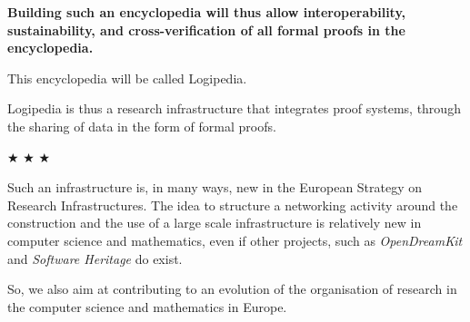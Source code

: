 {\bf Building such an encyclopedia will thus allow interoperability,
  sustainability, and cross-verification of all formal proofs in the
  encyclopedia.}

This encyclopedia will be called Logipedia.

Logipedia is thus a research infrastructure that integrates proof
systems, through the sharing of data in the form of formal proofs.




\begin{center}
$\bigstar$ $\bigstar$ $\bigstar$
\end{center}

Such an infrastructure is, in many ways, new in the European Strategy
on Research Infrastructures. The idea to structure a networking
activity around the construction and the use of a large scale
infrastructure is relatively new in computer science and mathematics,
even if other projects, such as {\em OpenDreamKit} and {\em Software
Heritage} do exist.

So, we also aim at contributing to an evolution of the organisation of
research in the computer science and mathematics in Europe.

